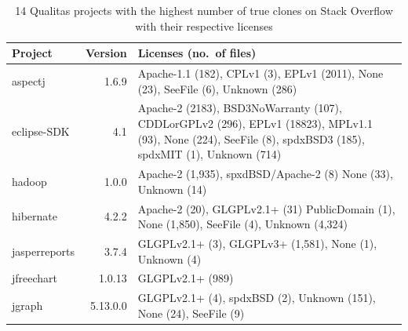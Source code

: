 \documentclass{sig-alternate-05-2015}
\begin{document}
\begin{table}
	\centering
	\caption{14 Qualitas projects with the highest number of true clones on Stack Overflow with their respective licenses}
	\label{t:new_and_old}
	\small
	\begin{tabular}{l|r|p{4cm}}
		\hline 
		Project & Version & Licenses (no.~of files) \\
		\hline
		aspectj & 1.6.9 & Apache-1.1 (182), CPLv1 (3), \newline EPLv1 (2011), None (23), \newline SeeFile (6), Unknown (286) \\
		\hline
		eclipse-SDK &  4.1 & Apache-2 (2183), \newline BSD3NoWarranty (107), \newline CDDLorGPLv2 (296), \newline EPLv1 (18823), MPLv1.1 (93), \newline None (224), SeeFile (8), \newline spdxBSD3 (185), \newline spdxMIT (1), Unknown (714) \\
		\hline
		hadoop & 1.0.0 & Apache-2 (1,935), \newline spxdBSD/Apache-2 (8) \newline None (33), Unknown (14) \\
		\hline
		hibernate & 4.2.2 & Apache-2 (20), \newline GLGPLv2.1+ (31) \newline PublicDomain (1), \newline None (1,850), SeeFile (4), \newline Unknown (4,324) \\
		\hline
		jasperreports & 3.7.4 & GLGPLv2.1+ (3), \newline GLGPLv3+ (1,581), \newline None (1), Unknown (4)\\
		\hline
		jfreechart & 1.0.13 & GLGPLv2.1+ (989) \\
		\hline
		jgraph & 5.13.0.0 & GLGPLv2.1+ (4), \newline spdxBSD (2), Unknown (151), \newline None (24), SeeFile (9) \\
		\hline

\end{tabular}
\end{table}
\end{document}
